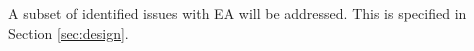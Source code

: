 A subset of identified issues with EA will be addressed. This is specified in Section \ref{sec:design}.